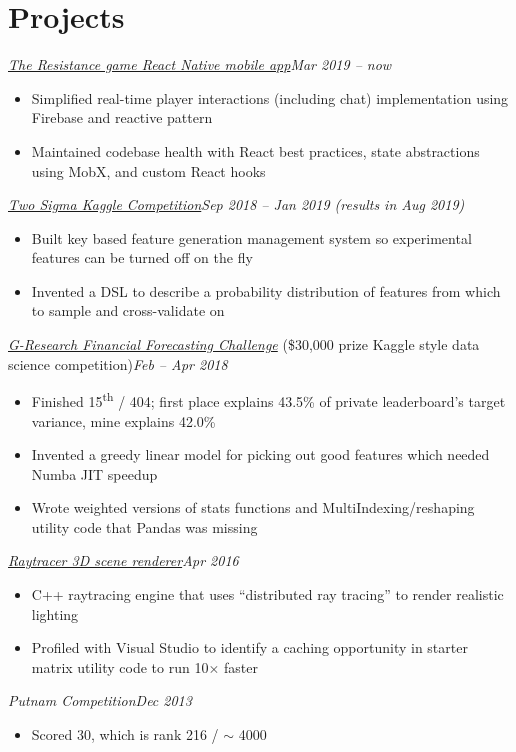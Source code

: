 \documentclass[10pt,letterpaper]{article}
\newcommand*\position[1]{\textit{#1}}
\newcommand*\timespan\position
\begin{document}
\section*{Projects}
\position{\href{https://github.com/yumichael/avalon}{The Resistance game React Native mobile app}}\hfill\timespan{Mar 2019 -- now}
\begin{itemize}
\item Simplified real-time player interactions (including chat) implementation using Firebase and reactive pattern
\item Maintained codebase health with React best practices, state abstractions using MobX, and custom React hooks
\end{itemize}
\position{\href{https://www.kaggle.com/c/two-sigma-financial-news/overview}{Two Sigma Kaggle Competition}}\hfill\timespan{Sep 2018 -- Jan 2019 (results in Aug 2019)}
\begin{itemize}
\item Built key based feature generation management system so experimental features can be turned off on the fly
\item Invented a DSL to describe a probability distribution of features from which to sample and cross-validate on
\end{itemize}
\position{\href{https://financialforecasting.gresearch.co.uk/}{G-Research Financial Forecasting Challenge}} (\$30,000 prize Kaggle style data science competition)\hfill\timespan{Feb -- Apr 2018}
\begin{itemize}
\item Finished 15\textsuperscript{th} / 404; first place explains 43.5\% of private leaderboard's target variance, mine explains 42.0\%
\item Invented a greedy linear model for picking out good features which needed Numba JIT speedup
\item Wrote weighted versions of stats functions and MultiIndexing/reshaping utility code that Pandas was missing
\end{itemize}
\position{\href{https://github.com/yumichael/raytrace}{Raytracer 3D scene renderer}}\hfill\timespan{Apr 2016}
\begin{itemize}
\item C++ raytracing engine that uses ``distributed ray tracing'' to render realistic lighting
\item Profiled with Visual Studio to identify a caching opportunity in starter matrix utility code to run 10\(\times\) faster
\end{itemize}
\position{Putnam Competition}\hfill\timespan{Dec 2013}
\begin{itemize}
\item Scored 30, which is rank 216 / \(\sim\) 4000
\end{itemize}
\end{document}
